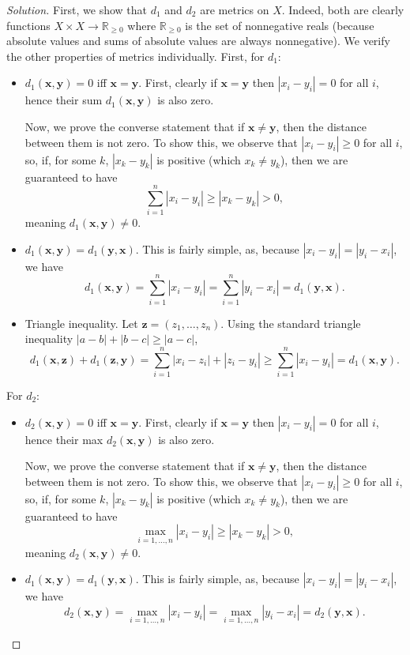 \documentclass[11pt]{scrartcl}
\providecommand{\RR}{\mathbb R}
\providecommand{\ii}{\item}
\theoremstyle{problem}
\theoremstyle{remark}
\newenvironment{soln}{\begin{proof}[Solution]}{\end{proof}}
\begin{document}
\begin{soln}
	First, we show that $d_1$ and $d_2$ are metrics on $X$.
	Indeed, both are clearly functions $X\times X\to\RR_{\ge0}$
	where $\RR_{\ge0}$ is the set of nonnegative reals
	(because absolute values and sums of absolute values
	are always nonnegative).
	We verify the other properties of metrics individually.
	First, for $d_1$:
	\begin{itemize}
		\ii $d_1(\mathbf x,\mathbf y) = 0$ iff $\mathbf x = \mathbf y$.
		First, clearly if $\mathbf x = \mathbf y$
		then $|x_i - y_i| = 0$ for all $i$, hence their sum
		$d_1(\mathbf x, \mathbf y)$ is also zero.
		
		Now, we prove the converse statement that
		if $\mathbf x\ne \mathbf y$, then the distance between them is not zero.
		To show this, we observe that $|x_i - y_i| \ge 0$ for all $i$,
		so, if, for some $k$,
		$|x_k - y_k|$ is positive (which $x_k\ne y_k$),
		then we are guaranteed to have
		\[\sum_{i=1}^n |x_i - y_i| \ge |x_k - y_k| > 0,\]
		meaning $d_1(\mathbf x,\mathbf y) \ne 0$.
		
		\ii $d_1(\mathbf x, \mathbf y) = d_1(\mathbf y, \mathbf x)$.
		This is fairly simple, as, because $|x_i - y_i| = |y_i - x_i|$, we have
		\[d_1(\mathbf x,\mathbf y) = \sum_{i=1}^n |x_i - y_i|
		= \sum_{i=1}^n |y_i - x_i| = d_1(\mathbf y, \mathbf x).\]
		
		\ii Triangle inequality. Let $\mathbf z = (z_1, \dots, z_n)$.
		Using the standard triangle inequality $|a - b| + |b - c| \ge |a - c|$,
		\[d_1(\mathbf x,\mathbf z) + d_1(\mathbf z,\mathbf y) =
		\sum_{i=1}^n |x_i - z_i| + |z_i - y_i| \ge
		\sum_{i=1}^n |x_i - y_i| = d_1(\mathbf x, \mathbf y).\]
	\end{itemize}
	For $d_2$:
	\begin{itemize}
		\ii $d_2(\mathbf x,\mathbf y) = 0$ iff $\mathbf x = \mathbf y$.
		First, clearly if $\mathbf x = \mathbf y$
		then $|x_i - y_i| = 0$ for all $i$, hence their max
		$d_2(\mathbf x, \mathbf y)$ is also zero.
		
		Now, we prove the converse statement that
		if $\mathbf x\ne \mathbf y$, then the distance between them is not zero.
		To show this, we observe that $|x_i - y_i| \ge 0$ for all $i$,
		so, if, for some $k$,
		$|x_k - y_k|$ is positive (which $x_k\ne y_k$),
		then we are guaranteed to have
		\[\max_{i=1,\dots,n} |x_i - y_i| \ge |x_k - y_k| > 0,\]
		meaning $d_2(\mathbf x,\mathbf y) \ne 0$.
		
		\ii $d_1(\mathbf x, \mathbf y) = d_1(\mathbf y, \mathbf x)$.
		This is fairly simple, as, because $|x_i - y_i| = |y_i - x_i|$, we have
		\[d_2(\mathbf x,\mathbf y) = \max_{i=1,\dots,n} |x_i - y_i|
		= \max_{i=1,\dots,n} |y_i - x_i| = d_2(\mathbf y, \mathbf x).\]
		

\end{itemize}
\end{soln}
\end{document}
